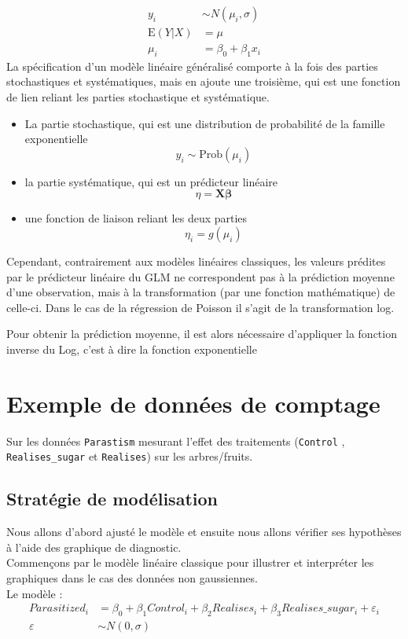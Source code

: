 \documentclass[12pt]{article}
\begin{document}
\begin{align*}
y_i &\sim N(\mu_i, \sigma)\\
\mathrm{E}(Y|X) &= \mu\\
\mu_i &= \beta_0 + \beta_1 x_i
\tag{2}
\end{align*}
La spécification d'un modèle linéaire généralisé comporte à la fois des parties stochastiques et systématiques, mais en ajoute une troisième, qui est une fonction de lien reliant les parties stochastique et systématique.
\begin{itemize}
    \item La partie stochastique, qui est une distribution de probabilité de la famille exponentielle
    \begin{equation*}
    y_i \sim \mathrm{Prob}(\mu_i)
    \end{equation*}
    \item la partie systématique, qui est un prédicteur linéaire
    \begin{equation*}
    \eta=\mathbf{X}\boldsymbol{\beta}
    \end{equation*}
    \item une fonction de liaison reliant les deux parties
    \begin{equation*}
    \eta_i = g(\mu_i)
    \end{equation*}
\end{itemize}

Cependant, contrairement aux modèles linéaires classiques, les valeurs prédites par le prédicteur linéaire du GLM ne correspondent pas à la prédiction moyenne d’une observation, mais à la transformation (par une fonction mathématique) de celle-ci. Dans le cas de la régression de Poisson il s’agit de la transformation log.

Pour obtenir la prédiction moyenne, il est alors nécessaire d’appliquer la fonction inverse du Log, c’est à dire la fonction exponentielle

\section{Exemple de données de comptage}
Sur les données \texttt{Parastism} mesurant l'effet des traitements (\texttt{Control} , \texttt{Realises\_sugar} et \texttt{Realises}) sur les arbres/fruits.

\subsection{Stratégie de modélisation}
Nous allons d'abord ajusté le modèle et ensuite nous allons vérifier ses hypothèses à l'aide des graphique de diagnostic.\\
Commençons par le modèle linéaire classique pour illustrer et interpréter les graphiques dans le cas des données non gaussiennes.\\
Le modèle :
\begin{align*}
Parasitized_i &= \beta_0 + \beta_1 Control_i + \beta_2 Realises_i + \beta_3 Realises\_sugar_i + \varepsilon_i \\
\varepsilon &\sim N(0, \sigma)
\tag{3}
\end{align*}
\end{document}
